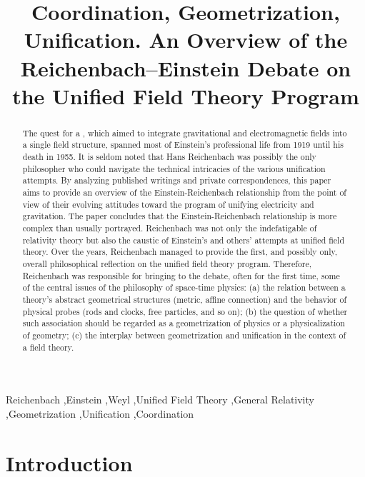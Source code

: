 \documentclass[final]{article}
\title{Coordination, Geometrization, Unification. An Overview of the Reichenbach--Einstein Debate on the Unified Field Theory Program}
\begin{document}
\maketitle

\begin{abstract}
The quest for a , which aimed to integrate gravitational and electromagnetic fields into a single field structure, spanned most of Einstein's professional life from 1919 until his death in 1955. It is seldom noted that Hans Reichenbach was possibly the only philosopher who could navigate the technical intricacies of the various unification attempts. By analyzing published writings and private correspondences, this paper aims to provide an overview of the Einstein-Reichenbach relationship from the point of view of their evolving attitudes toward the program of unifying electricity and gravitation. The paper concludes that the Einstein-Reichenbach relationship is more complex than usually portrayed. Reichenbach was not only the indefatigable  of relativity theory but also the caustic  of Einstein's and others' attempts at unified field theory. Over the years, Reichenbach managed to provide the first, and possibly only, overall philosophical reflection on the unified field theory program. Therefore, Reichenbach was responsible for bringing to the debate, often for the first time, some of the central issues of the philosophy of space-time physics: (a) the relation between a theory's abstract geometrical structures (metric, affine connection) and the behavior of physical probes (rods and clocks, free particles, and so on); (b) the question of whether such association should be regarded as a geometrization of physics or a physicalization of geometry; (c) the interplay between geometrization and unification in the context of a field theory.
\end{abstract}


\begin{keywords}
Reichenbach \sep Einstein \sep Weyl \sep Unified Field Theory \sep General Relativity \sep Geometrization \sep Unification \sep Coordination	
\end{keywords}

\section*{Introduction}
\end{document}
